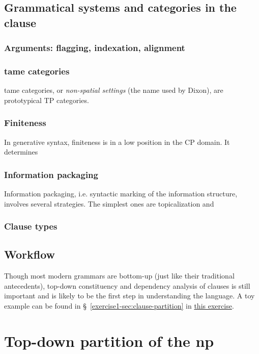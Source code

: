 \documentclass{article}
\newcommand*{\citesec}[1]{\S~{#1}}
\newcommand*{\term}[1]{\emph{#1}}
\newcommand{\exerciseone}{\href{../Exercise/2021-3.pdf}{this exercise}}
\begin{document}
\subsection{Grammatical systems and categories in the clause}

\subsubsection{Arguments: flagging, indexation, alignment}

\subsubsection{\ac{tame} categories}

\ac{tame} categories, or \term{non-spatial settings} (the name used by Dixon),
are prototypical TP categories.

\subsubsection{Finiteness}

In generative syntax, finiteness is in a low position in the CP domain.
It determines  

\subsubsection{Information packaging}

Information packaging, i.e. syntactic marking of the information structure,
involves several strategies.
The simplest ones are topicalization and 

\subsubsection{Clause types}

\subsection{Workflow}

Though most modern grammars are bottom-up (just like their traditional antecedents),
top-down constituency and dependency analysis of clauses is still important
and is likely to be the first step in understanding the language.
A toy example can be found in \citesec{\ref{exercise1-sec:clause-partition}} in \exerciseone.

\section{Top-down partition of the \acl{np}}\label{sec:np-top-down}
\end{document}
